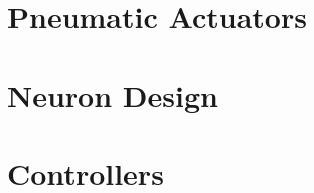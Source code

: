 \section{Pneumatic Actuators}

\cite{latexcompanion}

\section{Neuron Design}

\section{Controllers}